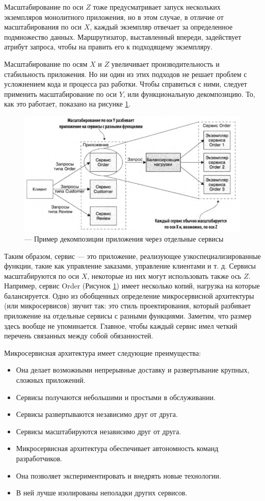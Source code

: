 Масштабирование по оси $Z$ тоже предусматривает запуск нескольких экземпляров
монолитного приложения, но в этом случае, в отличие от масштабирования по
оси $X$, каждый экземпляр отвечает за определенное подмножество данных.
Маршрутизатор, выставленный впереди, задействует атрибут запроса, чтобы на
править его к подходящему экземпляру. 

Масштабирование по осям $X$ и $Z$ увеличивает производительность и стабильность приложения.
Но ни один из этих подходов не решает проблем с усложнением кода и процесса раз
работки. Чтобы справиться с ними, следует применить масштабирование по оси $Y$,
или функциональную декомпозицию. То, как это работает, показано на рисунке \ref{fig:y}.
\begin{figure}[H]
    \centering
    \includegraphics[width=0.8\linewidth]{img/y.png}
    \caption{--- Пример декомпозиции приложения через отдельные сервисы}
    \label{fig:y}
\end{figure}

Таким образом, сервис — это приложение, реализующее узкоспециализированные функции, такие как управление заказами, управление клиентами и т. д. 
Сервисы масштабируются по оси $X$, некоторые из них могут использовать также ось $Z$. Например,
сервис Order (Рисунок \ref{fig:y}) имеет несколько копий, нагрузка на которые балансируется.
Одно из обобщенных определение микросервисной архитектуры (или микросервисов)
звучит так: это стиль проектирования, который разбивает приложение на отдельные
сервисы с разными функциями. Заметим, что размер здесь вообще не упоминается.
Главное, чтобы каждый сервис имел четкий перечень связанных между собой обязанностей.

Микросервисная архитектура имеет следующие преимущества:
\begin{itemize}
    \item Она делает возможными непрерывные доставку и развертывание крупных, сложных приложений.
    \item Сервисы получаются небольшими и простыми в обслуживании.
    \item Сервисы развертываются независимо друг от друга.
    \item Сервисы масштабируются независимо друг от друга.
    \item Микросервисная архитектура обеспечивает автономность команд разработчиков.
    \item Она позволяет экспериментировать и внедрять новые технологии.
    \item В ней лучше изолированы неполадки других сервисов.
\end{itemize}

